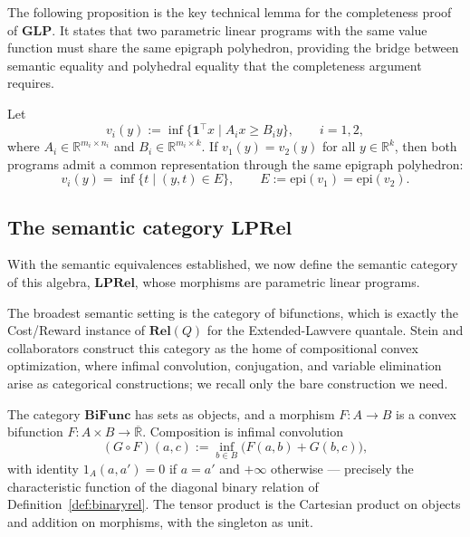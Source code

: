 The following proposition is the key technical lemma for the completeness
proof of $\mathbf{GLP}$. It states that two parametric linear programs
with the same value function must share the same epigraph polyhedron,
providing the bridge between semantic equality and polyhedral equality
that the completeness argument requires.

\begin{proposition}\label{prop:equalepi}
	Let
	\[
		v_i(y) := \inf\{\mathbf{1}^\top x \mid A_i x \ge B_i y\},
		\qquad i=1,2,
	\]
	where $A_i \in \mathbb{R}^{m_i \times n_i}$ and
	$B_i \in \mathbb{R}^{m_i \times k}$. If $v_1(y) = v_2(y)$ for all
	$y \in \mathbb{R}^k$, then both programs admit a common representation
	through the same epigraph polyhedron:
	\[
		v_i(y) = \inf\{t \mid (y,t) \in E\},
		\qquad
		E := \mathrm{epi}(v_1) = \mathrm{epi}(v_2).
	\]
\end{proposition}

\subsection{The semantic category \texorpdfstring{$\mathbf{LPRel}$}{LPRel}}

With the semantic equivalences established, we now define the semantic category of this algebra, $\mathbf{LPRel}$, whose morphisms are parametric linear programs.

The broadest semantic setting is the category of bifunctions, which is exactly the Cost/Reward instance of $\mathbf{Rel}(Q)$ for the Extended-Lawvere quantale. Stein and collaborators \cite{stein2024compositional,stein2025compositional} construct this category as the home of compositional convex optimization, where infimal convolution, conjugation, and variable elimination arise as categorical constructions; we recall only the bare construction we need.

\begin{definition}\label{def:bifunc}
	The category $\mathbf{BiFunc}$ has sets as objects, and a morphism $F : A \to B$ is a convex bifunction
	$F : A \times B \to \overline{\mathbb{R}}$.
	Composition is infimal convolution
	\[
		(G \circ F)(a,c) := \inf_{b \in B} \big( F(a,b) + G(b,c) \big),
	\]
	with identity $1_A(a,a') = 0$ if $a=a'$ and $+\infty$ otherwise ---
	precisely the characteristic function of the diagonal binary relation
	of Definition~\ref{def:binaryrel}. The tensor product is the Cartesian product on objects and addition on morphisms, with the singleton as unit.
\end{definition}

